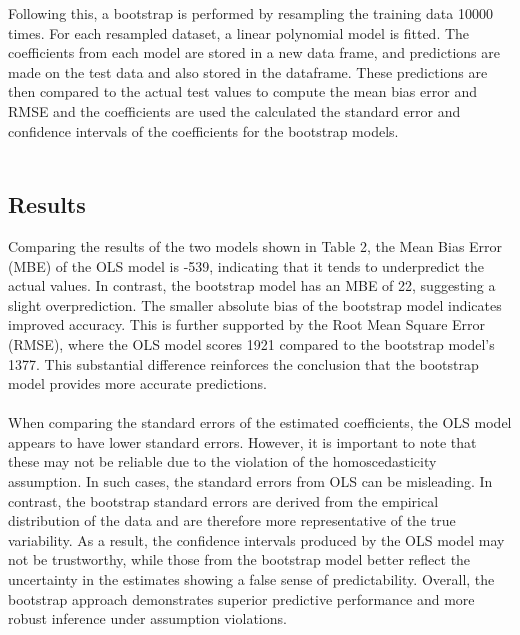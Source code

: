 \noindent Following this, a bootstrap is performed by resampling the training data 10000 times. For each resampled dataset, a linear polynomial model is fitted. The coefficients from each model are stored in a new data frame, and predictions are made on the test data and also stored in the dataframe. These predictions are then compared to the actual test values to compute the mean bias error and RMSE and the coefficients are used the calculated the standard error and confidence intervals of the coefficients for the bootstrap models.
\\\\



\subsection{Results}
Comparing the results of the two models shown in Table 2, the Mean Bias Error (MBE) of the OLS model is -539, indicating that it tends to underpredict the actual values. In contrast, the bootstrap model has an MBE of 22, suggesting a slight overprediction. The smaller absolute bias of the bootstrap model indicates improved accuracy. This is further supported by the Root Mean Square Error (RMSE), where the OLS model scores 1921 compared to the bootstrap model’s 1377. This substantial difference reinforces the conclusion that the bootstrap model provides more accurate predictions.
\\\\
When comparing the standard errors of the estimated coefficients, the OLS model appears to have lower standard errors. However, it is important to note that these may not be reliable due to the violation of the homoscedasticity assumption. In such cases, the standard errors from OLS can be misleading. In contrast, the bootstrap standard errors are derived from the empirical distribution of the data and are therefore more representative of the true variability. As a result, the confidence intervals produced by the OLS model may not be trustworthy, while those from the bootstrap model better reflect the uncertainty in the estimates showing a false sense of predictability. Overall, the bootstrap approach demonstrates superior predictive performance and more robust inference under assumption violations.
\\



